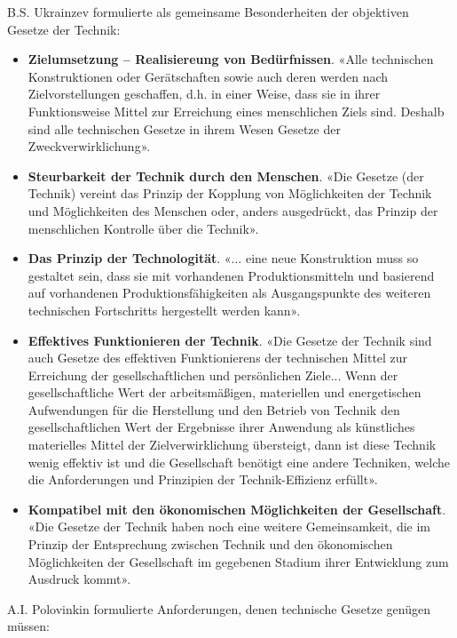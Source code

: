 \documentclass[11pt,a4paper]{article}
\begin{document}
B.S. Ukrainzev formulierte als gemeinsame Besonderheiten der objektiven
Gesetze der Technik:
\begin{itemize}
\item \textbf{Zielumsetzung -- Realisiereung von Bedürfnissen}. «Alle
  technischen Konstruktionen oder Gerätschaften sowie auch deren werden nach
  Zielvorstellungen geschaffen, d.h. in einer Weise, dass sie in ihrer
  Funktionsweise Mittel zur Erreichung eines menschlichen Ziels sind.  Deshalb
  sind alle technischen Gesetze in ihrem Wesen Gesetze der
  Zweckverwirklichung».
\item \textbf{Steurbarkeit der Technik durch den Menschen}. «Die Gesetze (der
  Technik) vereint das Prinzip der Kopplung von Möglichkeiten der Technik und
  Möglichkeiten des Menschen oder, anders ausgedrückt, das Prinzip der
  menschlichen Kontrolle über die Technik».
\item \textbf{Das Prinzip der Technologität}. «... eine neue Konstruktion muss
  so gestaltet sein, dass sie mit vorhandenen Produktionsmitteln und basierend
  auf vorhandenen Produktionsfähigkeiten als Ausgangspunkte des weiteren
  technischen Fortschritts hergestellt werden kann».
\item \textbf{Effektives Funktionieren der Technik}. «Die Gesetze der Technik
  sind auch Gesetze des effektiven Funktionierens der technischen Mittel zur
  Erreichung der gesellschaftlichen und persönlichen Ziele... Wenn der
  gesellschaftliche Wert der arbeitsmäßigen, materiellen und energetischen
  Aufwendungen für die Herstellung und den Betrieb von Technik den
  gesellschaftlichen Wert der Ergebnisse ihrer Anwendung als künstliches
  materielles Mittel der Zielverwirklichung übersteigt, dann ist diese Technik
  wenig effektiv ist und die Gesellschaft benötigt eine andere Techniken,
  welche die Anforderungen und Prinzipien der Technik-Effizienz erfüllt».
\item \textbf{Kompatibel mit den ökonomischen Möglichkeiten der Gesellschaft}.
  «Die Gesetze der Technik haben noch eine weitere Gemeinsamkeit, die im
  Prinzip der Entsprechung zwischen Technik und den ökonomischen
  Möglichkeiten der Gesellschaft im gegebenen Stadium ihrer Entwicklung zum
  Ausdruck kommt».
\end{itemize}
A.I. Polovinkin formulierte Anforderungen, denen technische Gesetze genügen
müssen:
\end{document}
